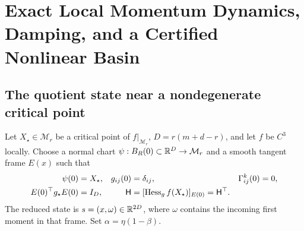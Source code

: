 \section{Exact Local Momentum Dynamics, Damping, and a Certified Nonlinear Basin}
\label{app:local-dynamics}
\subsection{The quotient state near a nondegenerate critical point}
\begin{definition}
Let $X_\star\in\mathcal M_r$ be a critical point of $f|_{\mathcal M_r}$,
$D=r(m+d-r)$, and let $f$ be $C^3$ locally. Choose a normal chart
$\psi:B_R(0)\subset\mathbb R^D\to\mathcal M_r$ and a smooth tangent frame
$E(x)$ such that
\begin{align}
\psi(0)&=X_\star,&g_{ij}(0)&=\delta_{ij},&
\Gamma^k_{ij}(0)&=0,\\
E(0)^\top g_\star E(0)&=I_D,&
\mathsf H&=[\operatorname{Hess}_g f(X_\star)]_{E(0)}=\mathsf H^\top .
\end{align}
The reduced state is $s=(x,\omega)\in\mathbb R^{2D}$, where $\omega$
contains the incoming first moment in that frame.
Set $\alpha=\eta(1-\beta)$.
\end{definition}

